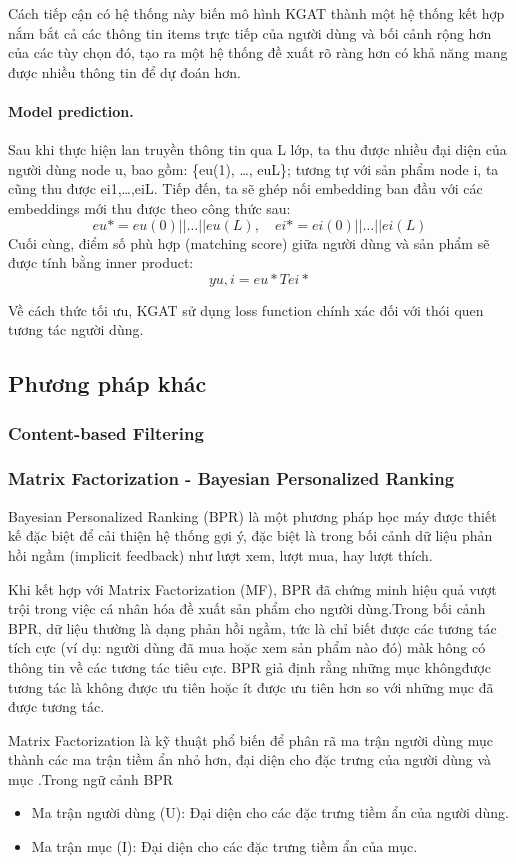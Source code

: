 Cách tiếp cận có hệ thống này biến mô hình KGAT thành một hệ thống kết hợp nắm bắt cả các thông tin items trực tiếp của người dùng và bối cảnh rộng hơn của các tùy chọn đó, tạo ra một hệ thống đề xuất rõ ràng hơn có khả năng mang được nhiều thông tin để dự đoán hơn.

\paragraph{Model prediction.}
Sau khi thực hiện lan truyền thông tin qua L lớp, ta thu được nhiều đại diện của người dùng node u, bao gồm: \{eu(1), …, euL\}; tương tự với sản phẩm node i, ta cũng thu được ei1,…,eiL. Tiếp đến, ta sẽ ghép nối embedding ban đầu với các embeddings mới thu được theo công thức sau:
\[
eu* = eu(0) || … || eu(L), \quad ei* = ei(0) || … || ei(L)
\]
Cuối cùng, điểm số phù hợp (matching score) giữa người dùng và sản phẩm sẽ được tính bằng inner product:
\[
yu,i = eu*T e i*
\]

Về cách thức tối ưu, KGAT sử dụng loss function chính xác đối với thói quen tương tác người dùng.

\subsection{Phương pháp khác}
\subsubsection{Content-based Filtering}
\subsubsection{Matrix Factorization - Bayesian Personalized Ranking}


Bayesian Personalized Ranking (BPR) là một phương pháp học máy được thiết kế đặc
biệt để cải thiện hệ thống gợi ý, đặc biệt là trong bối cảnh dữ liệu phản hồi
ngầm (implicit feedback) như lượt xem, lượt mua, hay lượt thích.

Khi kết hợp với Matrix Factorization (MF), BPR đã chứng minh hiệu quả vượt trội
trong việc cá nhân hóa đề xuất sản phẩm cho người dùng.Trong bối cảnh BPR, dữ
liệu thường là dạng phản hồi ngầm, tức là chỉ biết được các tương tác tích cực
(ví dụ: người dùng đã mua hoặc xem sản phẩm nào đó) màk hông có thông tin về
các tương tác tiêu cực. BPR giả định rằng những mục khôngđược tương tác là
không được ưu tiên hoặc ít được ưu tiên hơn so với những mục đã được tương tác.

Matrix Factorization là kỹ thuật phổ biến để phân rã ma trận người dùng mục
thành các ma trận tiềm ẩn nhỏ hơn, đại diện cho đặc trưng của người dùng và mục
.Trong ngữ cảnh BPR\:
\begin{itemize}
    \item Ma trận người dùng (U): Đại diện cho các đặc trưng tiềm ẩn của người dùng.
    \item Ma trận mục (I): Đại diện cho các đặc trưng tiềm ẩn của mục.
\end{itemize}

